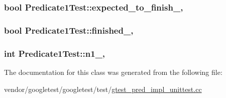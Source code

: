 \subsubsection[{\texorpdfstring{expected\+\_\+to\+\_\+finish\+\_\+}{expected_to_finish_}}]{\setlength{\rightskip}{0pt plus 5cm}bool Predicate1\+Test\+::expected\+\_\+to\+\_\+finish\+\_\+\hspace{0.3cm}{\ttfamily [static]}, {\ttfamily [protected]}}\hypertarget{classPredicate1Test_ad91cfa58e6352d53abacce32df2ef635}{}\label{classPredicate1Test_ad91cfa58e6352d53abacce32df2ef635}
\subsubsection[{\texorpdfstring{finished\+\_\+}{finished_}}]{\setlength{\rightskip}{0pt plus 5cm}bool Predicate1\+Test\+::finished\+\_\+\hspace{0.3cm}{\ttfamily [static]}, {\ttfamily [protected]}}\hypertarget{classPredicate1Test_a6d45fb2d1f01a5c8baf28f60039c244e}{}\label{classPredicate1Test_a6d45fb2d1f01a5c8baf28f60039c244e}
\subsubsection[{\texorpdfstring{n1\+\_\+}{n1_}}]{\setlength{\rightskip}{0pt plus 5cm}int Predicate1\+Test\+::n1\+\_\+\hspace{0.3cm}{\ttfamily [static]}, {\ttfamily [protected]}}\hypertarget{classPredicate1Test_a528d9f7f618b17802962a3824eea11e3}{}\label{classPredicate1Test_a528d9f7f618b17802962a3824eea11e3}


The documentation for this class was generated from the following file\+:\begin{DoxyCompactItemize}
\item 
vendor/googletest/googletest/test/\hyperlink{gtest__pred__impl__unittest_8cc}{gtest\+\_\+pred\+\_\+impl\+\_\+unittest.\+cc}\end{DoxyCompactItemize}
